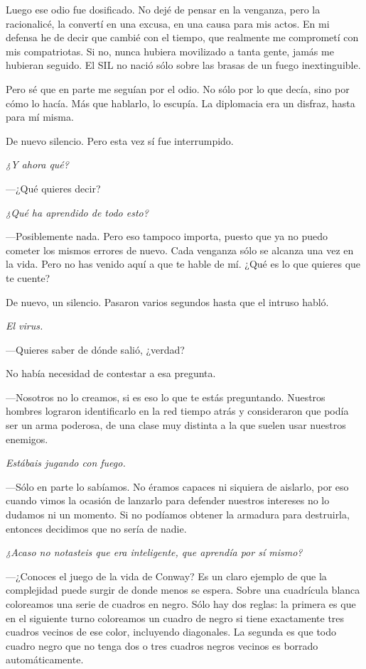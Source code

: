 \rquoti{}Luego ese odio fue dosificado. No dejé de pensar en la venganza, pero la racionalicé, la convertí en una excusa, en una causa para mis actos. En mi defensa he de decir que cambié con el tiempo, que realmente me comprometí con mis compatriotas. Si no, nunca hubiera movilizado a tanta gente, jamás me hubieran seguido. El SIL no nació sólo sobre las brasas de un fuego inextinguible.

\rquoti{}Pero sé que en parte me seguían por el odio. No sólo por lo que decía, sino por cómo lo hacía. Más que hablarlo, lo escupía. La diplomacia era un disfraz, hasta para mí misma.

De nuevo silencio. Pero esta vez sí fue interrumpido.

\emph{¿Y ahora qué?}

---¿Qué quieres decir?

\emph{¿Qué ha aprendido de todo esto?}

---Posiblemente nada. Pero eso tampoco importa, puesto que ya no puedo cometer los mismos errores de nuevo. Cada venganza sólo se alcanza una vez en la vida. Pero no has venido aquí a que te hable de mí. ¿Qué es lo que quieres que te cuente?

De nuevo, un silencio. Pasaron varios segundos hasta que el intruso habló.

\emph{El virus.}

---Quieres saber de dónde salió, ¿verdad?

No había necesidad de contestar a esa pregunta.

---Nosotros no lo creamos, si es eso lo que te estás preguntando. Nuestros hombres lograron identificarlo en la red tiempo atrás y consideraron que podía ser un arma poderosa, de una clase muy distinta a la que suelen usar nuestros enemigos.

\emph{Estábais jugando con fuego.}

---Sólo en parte lo sabíamos. No éramos capaces ni siquiera de aislarlo, por eso cuando vimos la ocasión de lanzarlo para defender nuestros intereses no lo dudamos ni un momento. Si no podíamos obtener la armadura para destruirla, entonces decidimos que no sería de nadie.

\emph{¿Acaso no notasteis que era inteligente, que aprendía por sí mismo?}

---¿Conoces el juego de la vida de Conway? Es un claro ejemplo de que la complejidad puede surgir de donde menos se espera. Sobre una cuadrícula blanca coloreamos una serie de cuadros en negro. Sólo hay dos reglas: la primera es que en el siguiente turno coloreamos un cuadro de negro si tiene exactamente tres cuadros vecinos de ese color, incluyendo diagonales. La segunda es que todo cuadro negro que no tenga dos o tres cuadros negros vecinos es borrado automáticamente.

